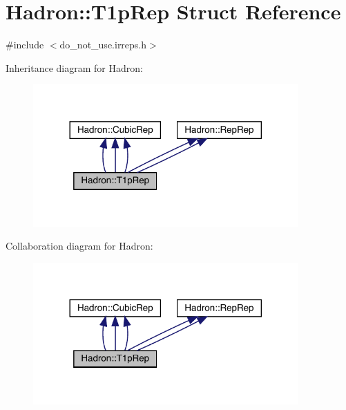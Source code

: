 \hypertarget{structHadron_1_1T1pRep}{}\section{Hadron\+:\+:T1p\+Rep Struct Reference}
\label{structHadron_1_1T1pRep}


{\ttfamily \#include $<$do\+\_\+not\+\_\+use.\+irreps.\+h$>$}



Inheritance diagram for Hadron\+:
\nopagebreak
\begin{figure}[H]
\begin{center}
\leavevmode
\includegraphics[width=288pt]{d3/d9b/structHadron_1_1T1pRep__inherit__graph}
\end{center}
\end{figure}


Collaboration diagram for Hadron\+:
\nopagebreak
\begin{figure}[H]
\begin{center}
\leavevmode
\includegraphics[width=288pt]{df/d19/structHadron_1_1T1pRep__coll__graph}
\end{center}
\end{figure}
